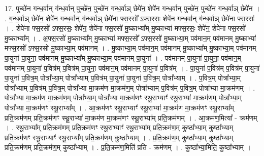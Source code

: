 \documentclass[17pt]{extarticle}
\begin{document}
17. पुच्छे॑न गन्ध॒र्वान् ग॑न्ध॒र्वान् पुच्छे॑न॒ पुच्छे॑न गन्ध॒र्वाञ् छेपे॑न॒ शेपे॑न गन्ध॒र्वान् पुच्छे॑न॒ पुच्छे॑न गन्ध॒र्वाञ् छेपे॑न । . ग॒न्ध॒र्वाञ् छेपे॑न॒ शेपे॑न गन्ध॒र्वान् ग॑न्ध॒र्वाञ् छेपे॑ना फ्स॒रसो᳚ ऽफ्स॒रसः॒ शेपे॑न गन्ध॒र्वान् ग॑न्ध॒र्वाञ् छेपे॑ना फ्स॒रसः॑ । . शेपे॑ना फ्स॒रसो᳚ ऽफ्स॒रसः॒ शेपे॑न॒ शेपे॑ना फ्स॒रसो॑ मु॒ष्काभ्या᳚म् मु॒ष्काभ्या॑ मफ्स॒रसः॒ शेपे॑न॒ शेपे॑ना फ्स॒रसो॑ मु॒ष्काभ्या᳚म् । . अ॒फ्स॒रसो॑ मु॒ष्काभ्या᳚म् मु॒ष्काभ्या॑ मफ्स॒रसो᳚ ऽफ्स॒रसो॑ मु॒ष्काभ्या॒म् पव॑मान॒म् पव॑मानम् मु॒ष्काभ्या॑ मफ्स॒रसो᳚ ऽफ्स॒रसो॑ मु॒ष्काभ्या॒म् पव॑मानम् । . मु॒ष्काभ्या॒म् पव॑मान॒म् पव॑मानम् मु॒ष्काभ्या᳚म् मु॒ष्काभ्या॒म् पव॑मानम् पा॒युना॑ पा॒युना॒ पव॑मानम् मु॒ष्काभ्या᳚म् मु॒ष्काभ्या॒म् पव॑मानम् पा॒युना᳚ । . पव॑मानम् पा॒युना॑ पा॒युना॒ पव॑मान॒म् पव॑मानम् पा॒युना॑ प॒वित्र॑म् प॒वित्र॑म् पा॒युना॒ पव॑मान॒म् पव॑मानम् पा॒युना॑ प॒वित्र᳚म् । . पा॒युना॑ प॒वित्र॑म् प॒वित्र॑म् पा॒युना॑ पा॒युना॑ प॒वित्र॒म् पोत्रा᳚भ्या॒म् पोत्रा᳚भ्याम् प॒वित्र॑म् पा॒युना॑ पा॒युना॑ प॒वित्र॒म् पोत्रा᳚भ्याम् । . प॒वित्र॒म् पोत्रा᳚भ्या॒म् पोत्रा᳚भ्याम् प॒वित्र॑म् प॒वित्र॒म् पोत्रा᳚भ्या मा॒क्रम॑ण मा॒क्रम॑ण॒म् पोत्रा᳚भ्याम् प॒वित्र॑म् प॒वित्र॒म् पोत्रा᳚भ्या मा॒क्रम॑णम् । . पोत्रा᳚भ्या मा॒क्रम॑ण मा॒क्रम॑ण॒म् पोत्रा᳚भ्या॒म् पोत्रा᳚भ्या मा॒क्रम॑णꣳ स्थू॒राभ्याꣳ॑ स्थू॒राभ्या॑ मा॒क्रम॑ण॒म् पोत्रा᳚भ्या॒म् पोत्रा᳚भ्या मा॒क्रम॑णꣳ स्थू॒राभ्या᳚म् । . आ॒क्रम॑णꣳ स्थू॒राभ्याꣳ॑ स्थू॒राभ्या॑ मा॒क्रम॑ण मा॒क्रम॑णꣳ स्थू॒राभ्या᳚म् प्रति॒क्रम॑णम् प्रति॒क्रम॑णꣳ स्थू॒राभ्या॑ मा॒क्रम॑ण मा॒क्रम॑णꣳ स्थू॒राभ्या᳚म् प्रति॒क्रम॑णम् । . आ॒क्रम॑ण॒मित्या᳚ - क्रम॑णम् । . स्थू॒राभ्या᳚म् प्रति॒क्रम॑णम् प्रति॒क्रम॑णꣳ स्थू॒राभ्याꣳ॑ स्थू॒राभ्या᳚म् प्रति॒क्रम॑ण॒म् कुष्ठा᳚भ्या॒म् कुष्ठा᳚भ्याम् प्रति॒क्रम॑णꣳ स्थू॒राभ्याꣳ॑ स्थू॒राभ्या᳚म् प्रति॒क्रम॑ण॒म् कुष्ठा᳚भ्याम् । . प्र॒ति॒क्रम॑ण॒म् कुष्ठा᳚भ्या॒म् कुष्ठा᳚भ्याम् प्रति॒क्रम॑णम् प्रति॒क्रम॑ण॒म् कुष्ठा᳚भ्याम् । . प्र॒ति॒क्रम॑ण॒मिति॑ प्रति - क्रम॑णम् । . कुष्ठा᳚भ्या॒मिति॒ कुष्ठा᳚भ्याम् । \newline
\pagebreak
{}
\end{document}
